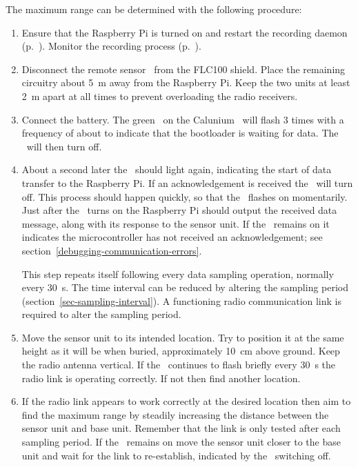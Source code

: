 The maximum range can be determined with the following procedure:
\begin{enumerate}
\item Ensure that the Raspberry Pi is turned on and restart the
  recording daemon (p.~\pageref{awnetd-restart}). Monitor the recording
  process (p.~\pageref{monitor-daemon-output}).
\item Disconnect the remote sensor \pcb\ from the FLC100 shield. Place
  the remaining circuitry about \SI{5}{\metre} away from the Raspberry
  Pi. Keep the two units at least \SI{2}{\metre} apart at all times to
  prevent overloading the radio receivers.
\item Connect the battery. The green \led\ on the Calunium \pcb\ will
  flash 3 times with a frequency of about  to indicate that the
  bootloader is waiting for data. The \led\ will then turn off.
\item \label{item-led-flash} About a second later the \led\ should
  light again, indicating the start of data transfer to the Raspberry
  Pi. If an acknowledgement is received the \led\ will turn off. This
  process should happen quickly, so that the \led\ flashes on
  momentarily. Just after the \led\ turns on the Raspberry Pi should
  output the received data message, along with its response to the
  sensor unit. If the \led\ remains on it indicates the
  microcontroller has not received an acknowledgement; see
  section~\ref{debugging-communication-errors}.
  
  This step repeats itself following every data sampling operation,
  normally every \SI{30}{\second}. The time interval can be reduced by
  altering the sampling period
  (section~\ref{sec-sampling-interval}). A functioning radio
  communication link is required to alter the sampling period.
\item Move the sensor unit to its intended location. Try to position
  it at the same height as it will be when buried, approximately
  \SI{10}{\centi\metre} above ground. Keep the radio antenna
  vertical. If the \led\ continues to flash briefly every
  \SI{30}{\second} the radio link is operating correctly. If not then
  find another location.
\item If the radio link appears to work correctly at the desired
  location then aim to find the maximum range by steadily increasing
  the distance between the sensor unit and base unit. Remember that the
  link is only tested after each sampling period. If the \led\ remains
  on move the sensor unit closer to the base unit and wait for the
  link to re-establish, indicated by the \led\ switching off.
\end{enumerate}

